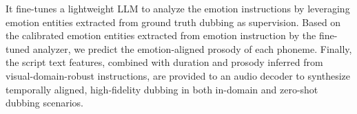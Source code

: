 It fine-tunes a lightweight LLM to analyze the emotion instructions by leveraging emotion entities extracted from ground truth dubbing as supervision.
Based on the calibrated emotion entities extracted from emotion instruction by the fine-tuned analyzer, we predict the emotion-aligned prosody of each phoneme.
Finally, the script text features, combined with duration and prosody inferred from visual-domain-robust instructions, are provided to an audio decoder to synthesize temporally aligned, high-fidelity dubbing in both in-domain and zero-shot dubbing scenarios.






